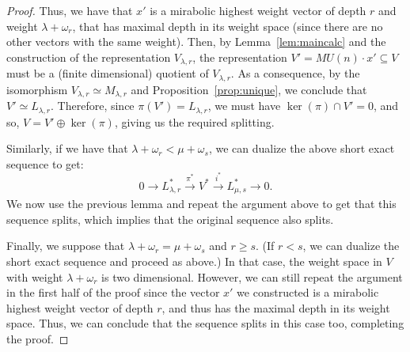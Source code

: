 \documentclass{amsart}
\numberwithin{equation}{section}
\theoremstyle{theorem}
\theoremstyle{definition}
\newcommand{\sub}{\subseteq}
\newcommand{\ra}{\rightarrow}
\newcommand{\xra}{\xrightarrow[]}
\begin{document}
\begin{proof}
Thus, we have that $x'$ is a mirabolic highest weight vector of depth $r$ and weight $\lambda+\omega_r$, that has maximal depth in its weight space (since there are no other vectors with the same weight). Then, by Lemma~\ref{lem:maincalc} and the construction of the representation $V_{\lambda,r}$, the representation $V'=MU(n) \cdot x'\sub V$ must be a (finite dimensional) quotient of $V_{\lambda, r}$. As a consequence, by the isomorphism $V_{\lambda,r}\simeq M_{\lambda,r}$ and Proposition~\ref{prop:unique}, we conclude that $V'\simeq L_{\lambda, r}$. Therefore, since $\pi(V')=L_{\lambda, r}$, we must have $\ker(\pi) \cap V' = 0$, and so, $V=V'\oplus \ker(\pi)$, giving us the required splitting.

Similarly, if we have that $\lambda+\omega_r<\mu+\omega_s$, we can dualize the above short exact sequence to get:
\[0\ra L_{\lambda,r}^* \xra{\pi^*} V^* \xra{i^*} L_{\mu,s}^*\ra 0.\]
We now use the previous lemma and repeat the argument above to get that this sequence splits, which implies that the original sequence also splits.

Finally, we suppose that $\lambda+\omega_r=\mu+\omega_s$ and $r\geq s$. (If $r< s$, we can dualize the short exact sequence and proceed as above.) In that case, the weight space in $V$ with weight $\lambda+\omega_r$ is two dimensional. However, we can still repeat the argument in the first half of the proof since the vector $x'$ we constructed is a mirabolic highest weight vector of depth $r$, and thus has the maximal depth in its weight space. Thus, we can conclude that the sequence splits in this case too, completing the proof.
\end{proof}
\end{document}
